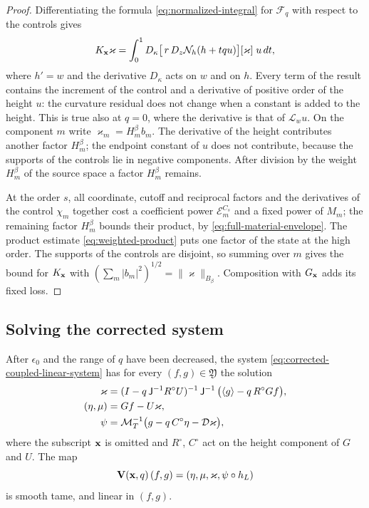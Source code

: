 \begin{proof}
Differentiating the formula \eqref{eq:normalized-integral} for
$\mathcal F_q$ with respect to the controls gives
\[
 K_{\mathbf x}\varkappa=\int_0^1D_\kappa\bigl[\,r\,D_z\mathcal N_{h}(h+tqu)\bigr]
 [\varkappa]\;u\,dt ,
\]
where $h'=w$ and the derivative $D_\kappa$ acts on $w$ and on $h$.
Every term of the result contains the increment of the control and a
derivative of positive order of the height $u$: the curvature
residual does not change when a constant is added to the height. This is true also at $q=0$, where
the derivative is that of $\mathscr L_wu$. On the component $m$ write
$\varkappa_m=H_m^\beta b_m$. The derivative of the height contributes
another factor $H_m^\beta$; the endpoint constant of $u$ does not
contribute, because the supports of the controls lie in negative
components. After division by the weight $H_m^\beta$ of the source
space a factor $H_m^\beta$ remains.

At the order $s$, all coordinate, cutoff and reciprocal factors and
the derivatives of the control $\chi_m$ together cost a coefficient
power $\mathcal E_m^{C_s}$ and a fixed power of $M_m$; the remaining
factor $H_m^\beta$ bounds their product, by
\eqref{eq:full-material-envelope}. The product estimate
\eqref{eq:weighted-product} puts one factor of the state at the high
order. The supports of the controls are disjoint, so summing over $m$
gives the bound for $K_{\mathbf x}$ with $(\sum_m|b_m|^2)^{1/2}
=\|\varkappa\|_{B_\beta}$. Composition with $G_{\mathbf x}$ adds its fixed
loss.
\end{proof}

\subsection{Solving the corrected system}

\begin{proposition}\label{prop:approx-inverse}
After $\epsilon_0$ and the range of $q$ have been decreased, the
system \eqref{eq:corrected-coupled-linear-system} has for every
$(f,g)\in\mathfrak Y$ the solution
\begin{equation}\label{eq:joint-height-circle-inverse}
 \begin{split}
 \varkappa&=(I-q\,\mathsf J^{-1}R^\circ U)^{-1}\,
         \mathsf J^{-1}\,\bigl(\langle g\rangle-q\,R^\circ Gf\bigr),\\
 (\eta,\mu)&=Gf-U\varkappa,\\
 \psi&=\mathcal M_T^{-1}\bigl(g-q\,C^\circ\eta-\mathcal D\varkappa\bigr),
 \end{split}
\end{equation}
where the subscript $\mathbf x$ is omitted and $R^\circ$, $C^\circ$ act on
the height component of $G$ and $U$. The map
\[
 \mathbf V(\mathbf x,q)\,(f,g)=(\eta,\mu,\varkappa,\psi\circ h_L)
\]
is smooth tame, and linear in $(f,g)$.
\end{proposition}

